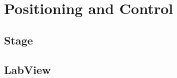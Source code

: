 \documentclass{article}
\begin{document}
\section{Positioning and Control}

\subsection{Stage}

\subsection{LabView}

%
\end{document}
